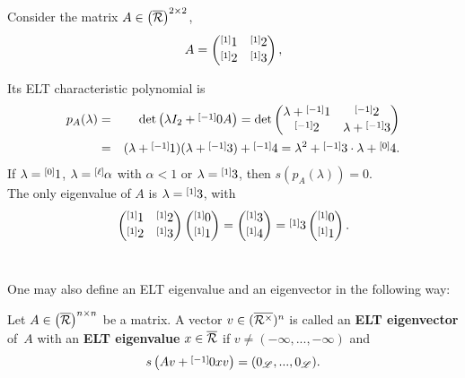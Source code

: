 \begin{example}
Consider the matrix $A\in\left(\overline{\R}\right)^{2\times 2}$,
$$A=\begin{pmatrix}\layer{1}{1} & \layer{2}{1} \\ \layer{2}{1} & \layer{3}{1} \end{pmatrix},$$

Its ELT characteristic polynomial is
\begin{eqnarray*}
p_A(\lambda)&=&\det\left(\lambda I_2+\layer{0}{-1}A\right)=
\det\left(\begin{matrix}\lambda+\layer{1}{-1} & \layer{2}{-1} \\
\layer{2}{-1} & \lambda+\layer{3}{-1}
\end{matrix}\right)\\
&=&(\lambda+\layer{1}{-1})(\lambda+\layer{3}{-1}) + \layer{4}{-1}=\lambda^2 + \layer{3}{-1}\cdot\lambda + \layer{4}{0}.
\end{eqnarray*}
If $\lambda=\layer{1}{0}$, $\lambda=\layer{\alpha}{\ell}$ with $\alpha < 1$ or $\lambda=\layer{3}{1}$, then $s\left(p_A(\lambda)\right)=0$.\\

The only eigenvalue of $A$ is $\lambda=\layer{3}{1}$, with
$$\begin{pmatrix}\layer{1}{1} & \layer{2}{1} \\ \layer{2}{1} & \layer{3}{1} \end{pmatrix}
\begin{pmatrix}\layer{0}{1} \\ \layer{1}{1} \end{pmatrix} =
\begin{pmatrix}\layer{3}{1} \\ \layer{4}{1} \end{pmatrix}=\layer{3}{1}\begin{pmatrix}\layer{0}{1} \\ \layer{1}{1} \end{pmatrix}.$$\\
\end{example}

One may also define an ELT eigenvalue and an eigenvector in the following way:

\begin{defn}\label{ELT_eigen_vector}
Let $A\in \left(\overline{\R}\right)^{n\times n}$ be a matrix. A vector $v\in (\overline{\R^{\times}})^n$ is called an \textbf{ELT eigenvector} of~$A$ with an \textbf{ELT eigenvalue} $x\in\overline{\R}$ if $v\neq (-\infty,...,-\infty)$ and
$$s\left(Av+\layer{0}{-1}xv\right)=(0_{\L},...,0_{\L}).$$
\end{defn}

